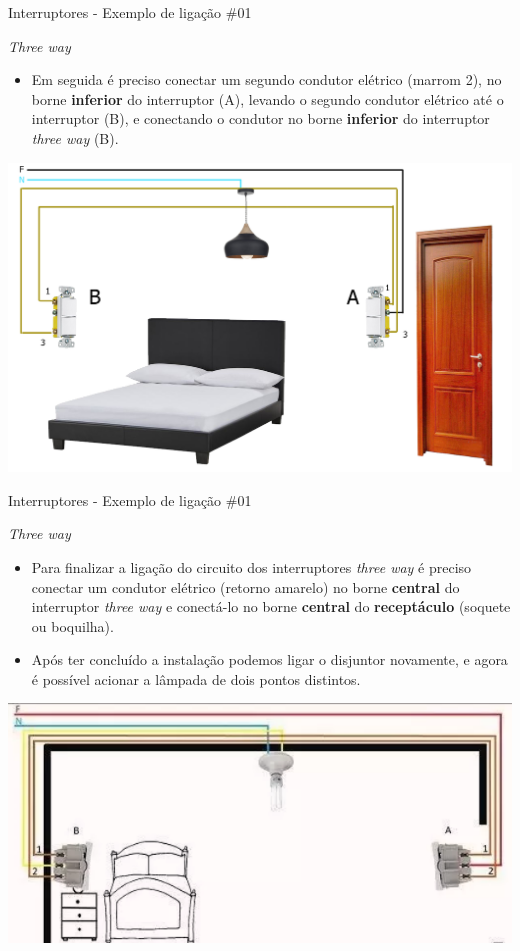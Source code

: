 \begin{frame}{Interruptores - Exemplo de ligação \#01}
	\begin{block}{\textit{Three way}}
		\begin{itemize}
			\item Em seguida é preciso conectar um segundo condutor elétrico (marrom 2), no borne \textbf{inferior} do interruptor (A), levando o segundo condutor elétrico até o interruptor (B), e conectando o condutor no borne \textbf{inferior} do interruptor \textit{three way} (B).
		\end{itemize}
	\end{block}

	\medskip

	\centering
	\includegraphics[width=0.65\linewidth]{Figuras/Ch08/fig20.3}
\end{frame}


\begin{frame}{Interruptores - Exemplo de ligação \#01}
	\begin{block}{\textit{Three way}}
		\begin{itemize}
			\item Para finalizar a ligação do circuito dos interruptores \textit{three way} é preciso conectar um condutor elétrico (retorno amarelo) no borne \textbf{central} do interruptor \textit{three way} e conectá-lo no borne \textbf{central} do \textbf{receptáculo} (soquete ou boquilha).
			\item Após ter concluído a instalação podemos ligar o disjuntor novamente, e agora é possível acionar a lâmpada de dois pontos distintos.
		\end{itemize}
	\end{block}

	\centering
	\includegraphics[width=0.6\linewidth]{Figuras/Ch08/fig21}
\end{frame}


